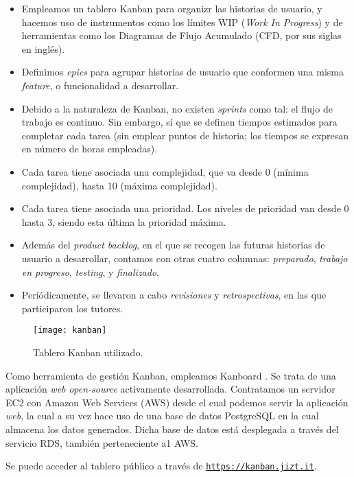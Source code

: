 \begin{itemize}
	\item [\textbullet] Empleamos un tablero Kanban para organizr las historias de usuario, y hacemos uso de instrumentos como los límites WIP (\emph{Work In Progress}) y de herramientas como los Diagramas de Flujo Acumulado (CFD, por sus siglas en inglés).
	\item [\textbullet] Definimos \emph{epics} para agrupar historias de usuario que conformen una misma \emph{feature}, o funcionalidad a desarrollar.
	\item [\textbullet] Debido a la naturaleza de Kanban, no existen \emph{sprints} como tal: el flujo de trabajo es continuo. Sin embargo, sí que se definen tiempos estimados para completar cada tarea (sin emplear puntos de historia; los tiempos se expresan en número de horas empleadas).
	\item [\textbullet] Cada tarea tiene asociada una complejidad, que va desde 0 (mínima complejidad), hasta 10 (máxima complejidad).
	\item [\textbullet] Cada tarea tiene asociada una prioridad. Los niveles de prioridad van desde 0 hasta 3, siendo esta última la prioridad máxima.
	\item [\textbullet] Además del \emph{product backlog}, en el que se recogen las futuras historias de usuario a desarrollar, contamos con otras cuatro columnas: \emph{preparado}, \emph{trabajo en progreso}, \emph{testing}, y \emph{finalizado}.
	\item [\textbullet] Periódicamente, se llevaron a cabo \emph{revisiones} y \emph{retrospectivas}, en las que participaron los tutores.
\end{itemize}

\vspace{-0.2cm}
\begin{figure}[h]
	\centering
	\texttt{[image: kanban]}
	\caption{Tablero Kanban utilizado.}
\end{figure}

Como herramienta de gestión Kanban, empleamos Kanboard \cite{kanboard}. Se trata de una aplicación \emph{web} \emph{open-source} activamente desarrollada. Contratamos un servidor EC2 con Amazon Web Services (AWS) desde el cual podemos servir la aplicación \emph{web}, la cual a su vez hace uso de una base de datos PostgreSQL en la cual almacena los datos generados. Dicha base de datos está desplegada a través del servicio RDS, también perteneciente a1 AWS.

Se puede acceder al tablero público a través de \href{https://kanban.jizt.it}{\texttt{https://kanban.jizt.it}}.




